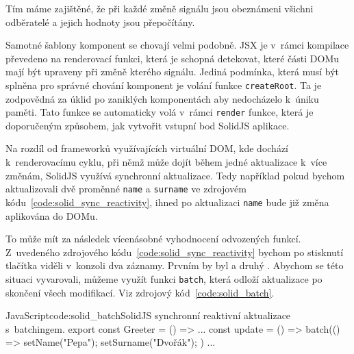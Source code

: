 \documentclass[
  master,
  program=ainf,
  printversion,
  tables=false,
  sourcecodes,
  glossaries,
  index
]{kidiplom}
\begin{document}
Tím máme zajištěné, že při každé změně signálu jsou obeznámeni všichni odběratelé a jejich hodnoty jsou
přepočítány.

Samotné šablony komponent se chovají velmi podobně. JSX je v~rámci kompilace převedeno na renderovací
funkci, která je schopná detekovat, které části DOMu mají být upraveny při změně kterého signálu.
Jediná podmínka, která musí být splněna pro správné chování komponent je volání funkce {\tt createRoot}. 
Ta je zodpovědná za úklid po zaniklých komponentách aby nedocházelo k~úniku paměti. Tato funkce se 
automaticky volá v~rámci {\tt render} funkce, která je doporučeným způsobem, jak vytvořit vstupní bod
SolidJS aplikace.

Na rozdíl od frameworků využívajících virtuální DOM, kde dochází k~renderovacímu cyklu, při němž 
může dojít během jedné aktualizace k~více změnám, SolidJS využívá synchronní aktualizace. Tedy například
pokud bychom aktualizovali dvě proměnné {\tt name} a {\tt surname} ve zdrojovém kódu~\ref{code:solid_sync_reactivity},
ihned po aktualizaci {\tt name} bude již změna aplikována do DOMu.

\begin{absolutelynopagebreak}
\end{absolutelynopagebreak}

To může mít za následek vícenásobné vyhodnocení odvozených funkcí. Z~uvedeného zdrojového kódu~\ref{code:solid_sync_reactivity} bychom po
stisknutí tlačítka viděli v~konzoli dva záznamy. Prvním by byl  a druhý .
Abychom se této situaci vyvarovali, můžeme využít funkci {\tt batch}, která odloží aktualizace po skončení
všech modifikací. Viz zdrojový kód~\ref{code:solid_batch}.

  \begin{kicode}{JavaScript}{code:solid_batch}{SolidJS synchronní reaktivní aktualizace s~batchingem.}
    export const Greeter = () => {
      ...
      const update = () => batch(() => {
        setName("Pepa");
        setSurname("Dvořák");
        })
        ...
        }
      \end{kicode}
\end{document}
